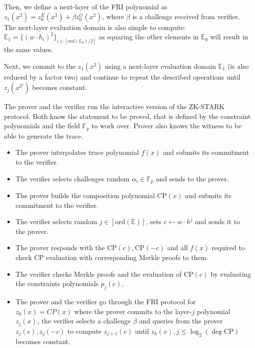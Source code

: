 \documentclass[../lecture-notes.tex]{subfiles}
\begin{document}
Then, we define a next-layer of the FRI polynomial as $z_1(x^2) = z_0^E(x^2) +
\beta z_0^O(x^2)$, where $\beta$ is a challenge received from verifier. The
next-layer evaluation domain is also simple to compute: $\mathbb{E}_1 =
\{(w\cdot h_i)^2\}_{i \in [\text{ord}(\mathbb{E}_0)/2]}$ as squaring the
other elements in $\mathbb{E}_0$ will result in the same values.

Next, we commit to the $z_1(x^2)$ using a next-layer evaluation domain
$\mathbb{E}_1$ (is also reduced by a factor two) and continue to repeat the
described operations until $z_j(x^{2^j})$ becomes constant.

\begin{tcolorbox}[title=Interactive ZK-STARK protocol,
    colback=blue!5!white,
    colframe=blue!75!black,
    colbacktitle=blue!25!white,
    coltitle=blue!20!black,
    fonttitle=\bfseries,
    boxrule=1.25pt,
    subtitle style={boxrule=0pt,
    colback=blue!20!white,
    colupper=blue!75!gray} ]
    \small

    The prover and the verifier run the interactive version of the ZK-STARK
    protocol. Both know the statement to be proved, that is defined by the
    constraint polynomials and the field $\mathbb{F}_p$ to work over. Prover also
    knows the witness to be able to generate the trace.

    \begin{itemize}[label=]
        \item The prover interpolates trace polynomial $f(x)$ and submits its
        commitment to the verifier.
        \item The verifier selects challenges random $\alpha_i \in \mathbb{F}_p$ 
        and sends to the prover.
        \item The prover builds the composition polynomial $\text{CP}(x)$ and
        submits its commitment to the verifier.
    \end{itemize}

    \begin{itemize}[label=]
        \item The verifier selects random $j \in [\text{ord}(\mathbb{E})]$, sets
        $c \gets w\cdot h^j$ and sends it to the prover.
        \item The prover responds with the $\text{CP}(c), \text{CP}(-c)$ and all
        $f(x)$ required to check $\text{CP}$ evaluation with corresponding Merkle
        proofs to them.
        \item The verifier checks Merkle proofs and the evaluation of
        $\text{CP}(c)$ by evaluating the constraints polynomials $p_j(c)$.
        \item The prover and the verifier go through the FRI protocol for
        $z_0(x) = CP(x)$ where the prover commits to the layer-$j$ polynomial
        $z_j(x)$, the verifier selects a challenge $\beta$ and queries from the
        prover $z_j(c), z_j(-c)$ to compute $z_{j+1}(c)$ until $z_k(x), j \leq
        \log_2(\deg \text{CP})$ becomes constant.
    \end{itemize}
    
\end{tcolorbox}
\end{document}
